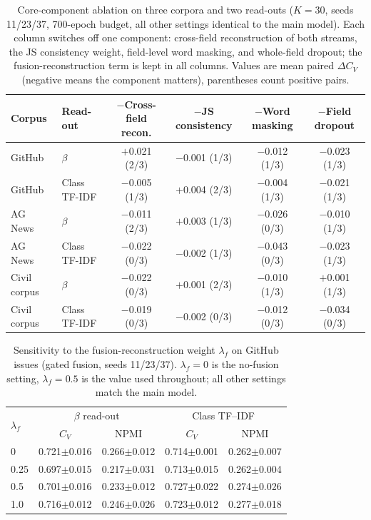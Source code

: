 \documentclass[11pt]{article}
\begin{document}
\begin{table}[t]
\centering
\caption{Core-component ablation on three corpora and two read-outs ($K=30$, seeds 11/23/37, 700-epoch budget, all other settings identical to the main model). Each column switches off one component: cross-field reconstruction of both streams, the JS consistency weight, field-level word masking, and whole-field dropout; the fusion-reconstruction term is kept in all columns. Values are mean paired $\Delta C_V$ (negative means the component matters), parentheses count positive pairs.}
\label{tab:core-ablation}
\small
\setlength{\tabcolsep}{5pt}
\begin{tabular}{llcccc}
\toprule
Corpus & Read-out & $-$Cross-field recon. & $-$JS consistency & $-$Word masking & $-$Field dropout \\
\midrule
GitHub & $\beta$ & $+$0.021 (2/3) & $-$0.001 (1/3) & $-$0.012 (1/3) & $-$0.023 (1/3) \\
GitHub & Class TF-IDF & $-$0.005 (1/3) & $+$0.004 (2/3) & $-$0.004 (1/3) & $-$0.021 (1/3) \\
\midrule
AG News & $\beta$ & $-$0.011 (2/3) & $+$0.003 (1/3) & $-$0.026 (0/3) & $-$0.010 (1/3) \\
AG News & Class TF-IDF & $-$0.022 (0/3) & $-$0.002 (1/3) & $-$0.043 (0/3) & $-$0.023 (1/3) \\
\midrule
Civil corpus & $\beta$ & $-$0.022 (0/3) & $+$0.001 (2/3) & $-$0.010 (1/3) & $+$0.001 (1/3) \\
Civil corpus & Class TF-IDF & $-$0.019 (0/3) & $-$0.002 (0/3) & $-$0.012 (0/3) & $-$0.034 (0/3) \\
\bottomrule
\end{tabular}
\end{table}

\begin{table}[t]
\centering
\caption{Sensitivity to the fusion-reconstruction weight $\lambda_f$ on GitHub issues (gated fusion, seeds 11/23/37). $\lambda_f=0$ is the no-fusion setting, $\lambda_f=0.5$ is the value used throughout; all other settings match the main model.}
\label{tab:weight}
\small
\setlength{\tabcolsep}{4pt}
\begin{tabular}{lcccc}
\toprule
\multirow{2}{*}{$\lambda_f$} & \multicolumn{2}{c}{$\beta$ read-out} & \multicolumn{2}{c}{Class TF--IDF} \\
 & $C_V$ & NPMI & $C_V$ & NPMI \\
\midrule
0 & 0.721$\pm$0.016 & 0.266$\pm$0.012 & 0.714$\pm$0.001 & 0.262$\pm$0.007 \\
0.25 & 0.697$\pm$0.015 & 0.217$\pm$0.031 & 0.713$\pm$0.015 & 0.262$\pm$0.004 \\
0.5 & 0.701$\pm$0.016 & 0.233$\pm$0.012 & 0.727$\pm$0.022 & 0.274$\pm$0.026 \\
1.0 & 0.716$\pm$0.012 & 0.246$\pm$0.026 & 0.723$\pm$0.012 & 0.277$\pm$0.018 \\
\bottomrule
\end{tabular}
\end{table}
\end{document}

